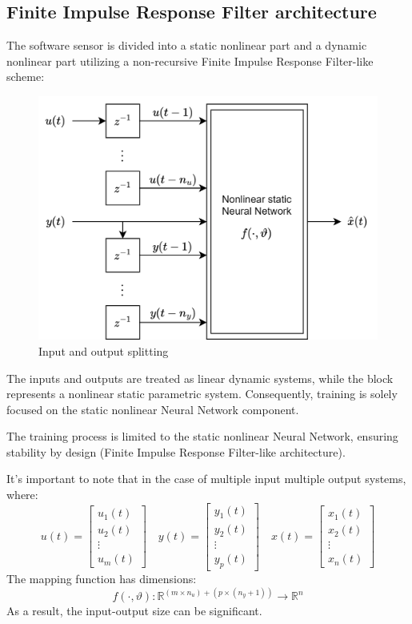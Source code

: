 \subsection{Finite Impulse Response Filter architecture}
The software sensor is divided into a static nonlinear part and a dynamic nonlinear part utilizing a non-recursive Finite Impulse Response Filter-like scheme:
\begin{figure}[H]
    \centering
    \includegraphics[width=0.5\linewidth]{images/split.png}
    \caption{Input and output splitting}
\end{figure}
The inputs and outputs are treated as linear dynamic systems, while the block represents a nonlinear static parametric system. 
Consequently, training is solely focused on the static nonlinear Neural Network component.

The training process is limited to the static nonlinear Neural Network, ensuring stability by design (Finite Impulse Response Filter-like architecture).

It's important to note that in the case of multiple input multiple output systems, where:
\[u(t)=\begin{bmatrix} u_1(t) \\ u_2(t) \\ \vdots \\ u_m(t) \end{bmatrix} \quad y(t)=\begin{bmatrix} y_1(t) \\ y_2(t) \\ \vdots \\ y_p(t) \end{bmatrix} \quad x(t)=\begin{bmatrix} x_1(t) \\ x_2(t) \\ \vdots \\ x_n(t) \end{bmatrix}\]
The mapping function has dimensions:
\[f(\cdot,\vartheta):\mathbb{R}^{(m \times n_u)+(p\times(n_y+1))}\rightarrow \mathbb{R}^n\]
As a result, the input-output size can be significant.

